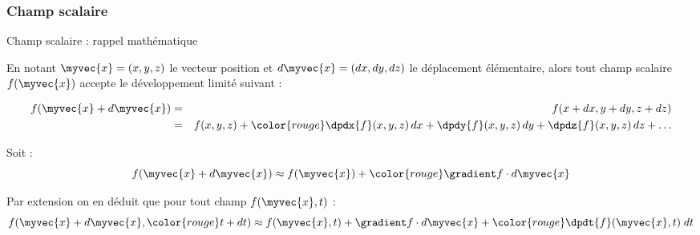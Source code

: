 \subsubsection{Champ scalaire}
\begin{frame}{Champ scalaire : rappel mathématique}

\small

En notant $\myvec{x} = (x, y, z)$ le vecteur position 
et $d\myvec{x} = (dx, dy, dz)$ le déplacement élémentaire,
alors tout champ scalaire $f(\myvec{x})$ accepte le développement limité suivant :

\begin{eqnarray*}
f(\myvec{x} + d\myvec{x}) & = & f(x+dx, y+dy, z+dz)
\\
& = & f(x, y, z) + {\color{rouge}\dpdx{f}(x, y, z)\,dx + \dpdy{f}(x, y, z)\, dy + \dpdz{f}(x, y, z)\, dz} + \ldots 
\end{eqnarray*}

Soit :
\[
	f(\myvec{x} + d\myvec{x}) \approx f(\myvec{x}) + {\color{rouge}\gradient f \cdot d\myvec{x}}
\]

\bigskip

\pause

Par extension on en déduit que pour tout champ $f(\myvec{x}, t)$ :
\[
	f(\myvec{x} + d\myvec{x}, {\color{rouge}t+dt}) \approx f(\myvec{x}, t) + \gradient f \cdot d\myvec{x}
	+ {\color{rouge} \dpdt{f}(\myvec{x}, t) \; dt} 
\]


\vspace{20mm}

\end{frame}

